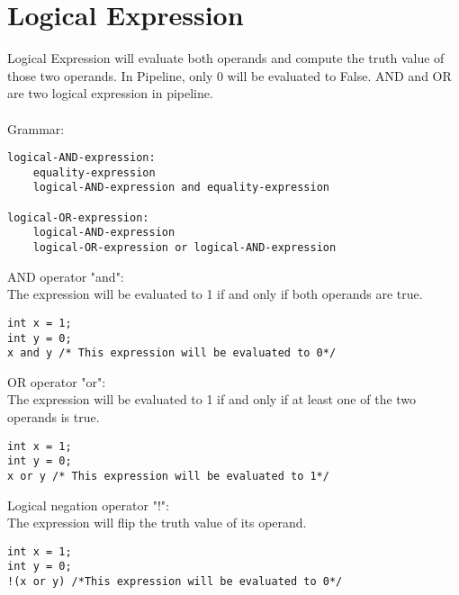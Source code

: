 \documentclass[./LRM_main.tex]{subfiles}
\begin{document}
\section{Logical Expression}
Logical Expression will evaluate both operands and compute the truth value of those two operands. In Pipeline, only 0 will be evaluated to False. AND and OR are two logical expression in pipeline.\\
\vspace{1 mm}\\
Grammar:
\begin{lstlisting}
logical-AND-expression:
    equality-expression
    logical-AND-expression and equality-expression

logical-OR-expression:
    logical-AND-expression
    logical-OR-expression or logical-AND-expression
\end{lstlisting}
AND operator "and":\\
The expression will be evaluated to 1 if and only if both operands are true.
\begin{lstlisting}
int x = 1;
int y = 0;
x and y /* This expression will be evaluated to 0*/
\end{lstlisting}
OR operator "or":\\
The expression will be evaluated to 1 if and only if at least one of the two operands is true.
\begin{lstlisting}
int x = 1;
int y = 0;
x or y /* This expression will be evaluated to 1*/
\end{lstlisting}
Logical negation operator "!":\\
The expression will flip the truth value of its operand.
\begin{lstlisting}
int x = 1;
int y = 0;
!(x or y) /*This expression will be evaluated to 0*/
\end{lstlisting}
\end{document}

